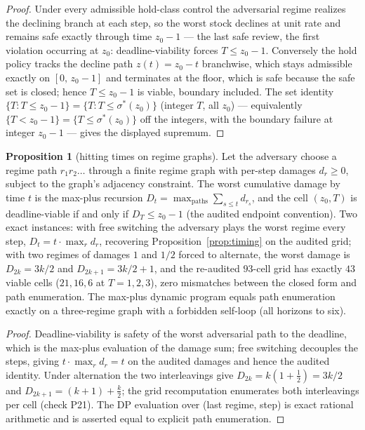 \documentclass[10pt,twocolumn]{article}
\theoremstyle{definition}
\newtheorem{proposition}{Proposition}
\begin{document}
\begin{proof}
Under every admissible hold-class control the adversarial regime realizes
the declining branch at each step, so the worst stock declines at unit
rate and remains safe exactly through time \(z_0 - 1\) --- the last
safe review, the first violation occurring at \(z_0\):
deadline-viability forces \(T \le z_0 - 1\). Conversely
the hold policy tracks the decline path \(z(t) = z_0 - t\) branchwise,
which stays admissible exactly on \([0,\, z_0 - 1]\) and terminates at
the floor, which is safe because the safe set is closed; hence
\(T \le z_0 - 1\) is viable, boundary included. The set identity
\(\{T : T \le z_0 - 1\} = \{T : T \le \sigma^{*}(z_0)\}\)
(integer \(T\), all \(z_0\)) --- equivalently \(\{T < z_0 - 1\} =
\{T \le \sigma^{*}(z_0)\}\) off the integers, with the boundary
failure at integer \(z_0 - 1\) --- gives the displayed supremum.
\end{proof}

\begin{proposition}[hitting times on regime graphs]\label{prop:regime}
Let the adversary choose a regime path \(r_1 r_2 \dots\) through a
finite regime graph with per-step damages \(d_r \ge 0\), subject to
the graph's adjacency constraint. The worst cumulative damage by time
\(t\) is the max-plus recursion
\(D_t = \max_{\text{paths}} \sum_{s \le t} d_{r_s}\), and the cell
\((z_0, T)\) is deadline-viable if and only if \(D_T \le z_0 - 1\)
(the audited endpoint convention). Two exact instances: with free
switching the adversary plays the worst regime every step, \(D_t = t
\cdot \max_r d_r\), recovering Proposition~\ref{prop:timing} on the
audited grid; with two regimes of damages \(1\) and \(1/2\) forced to
alternate, the worst damage is \(D_{2k} = 3k/2\) and \(D_{2k+1} = 3k/2
+ 1\), and the re-audited \(93\)-cell grid has exactly \(43\) viable
cells (\(21, 16, 6\) at \(T = 1, 2, 3\)), zero mismatches between the
closed form and path enumeration. The max-plus dynamic program equals
path enumeration exactly on a three-regime graph with a forbidden
self-loop (all horizons to six).
\end{proposition}

\begin{proof}
Deadline-viability is safety of the worst adversarial path to the
deadline, which is the max-plus evaluation of the damage sum; free
switching decouples the steps, giving \(t \cdot \max_r d_r = t\) on
the audited damages and hence the audited identity. Under alternation
the two interleavings give \(D_{2k} = k(1 + \tfrac12) = 3k/2\) and
\(D_{2k+1} = (k+1) + \tfrac{k}{2}\); the grid recomputation enumerates
both interleavings per cell (check P21). The DP evaluation over
(last regime, step) is exact rational arithmetic and is asserted equal
to explicit path enumeration.
\end{proof}
\end{document}
